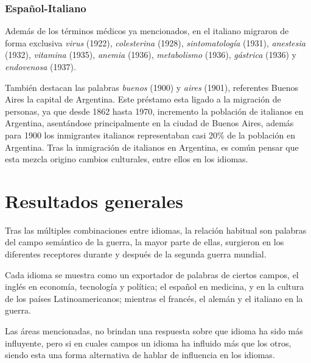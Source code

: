 \subsubsection*{Español-Italiano}%

Además de los términos médicos ya mencionados, en el italiano migraron de forma  exclusiva  \textit{virus} (1922), \textit{colesterina} (1928),  \textit{sintomatología} (1931), \textit{anestesia} (1932), \textit{vitamina} (1935), \textit{anemia} (1936), \textit{metabolismo} (1936),  \textit{gástrica} (1936)  y \textit{endovenosa} (1937).  

También destacan las palabras  \textit{buenos} (1900) y \textit{aires} (1901), referentes Buenos Aires la capital de Argentina. Este préstamo esta ligado a la migración de personas,  ya que desde 1862 hasta 1970, incremento la población de italianos en Argentina,  asentándose principalmente en la ciudad de Buenos Aires,  además para 1900 los inmigrantes italianos representaban casi 20$\%$ de la población en Argentina.  Tras la inmigración de italianos en Argentina, es común pensar que esta mezcla origino cambios culturales, entre ellos en los idiomas. 







\section{Resultados generales}%



Tras las múltiples combinaciones entre idiomas, la relación habitual son palabras del campo semántico de la guerra, la mayor parte de ellas, surgieron en los diferentes receptores durante y después de la segunda guerra mundial. 

Cada idioma se muestra como un exportador de palabras de ciertos campos,  el inglés en economía, tecnología y política; el español en medicina, y en la cultura de los países Latinoamericanos; mientras el francés, el alemán y el italiano en la guerra.  

Las áreas mencionadas, no brindan una respuesta sobre que idioma ha sido más influyente, pero si en cuales campos un idioma ha influido más que los otros, siendo esta una forma alternativa de hablar de influencia en los idiomas.
 
